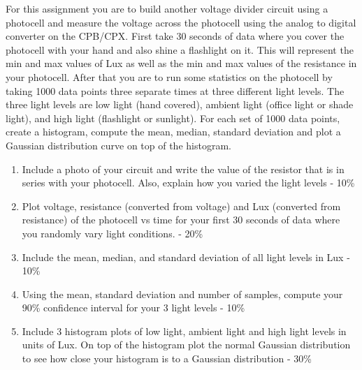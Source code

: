 For this assignment you are to build another voltage divider circuit using a photocell and measure the voltage across the photocell using the analog to digital converter on the CPB/CPX. First take 30 seconds of data where you cover the photocell with your hand and also shine a flashlight on it. This will represent the min and max values of Lux as well as the min and max values of the resistance in your photocell. After that you are to run some statistics on the photocell by taking 1000 data points three separate times at three different light levels. The three light levels are low light (hand covered), ambient light (office light or shade light), and high light (flashlight or sunlight). For each set of 1000 data points, create a histogram, compute the mean, median, standard deviation and plot a Gaussian distribution curve on top of the histogram. 


        
\begin{enumerate}[itemsep=-5pt]
\item Include a photo of your circuit and write the value of the resistor that is in series with your photocell. Also, explain how you varied the light levels - 10\%
\item Plot voltage, resistance (converted from voltage) and Lux (converted from resistance) of the photocell vs time for your first 30 seconds of data where you randomly vary light conditions. - 20\%
\item Include the mean, median, and standard deviation of all light levels in Lux - 10\%
\item Using the mean, standard deviation and number of samples, compute your 90\% confidence interval for your 3 light levels - 10\%
\item Include 3 histogram plots of low light, ambient light and high
light levels in units of Lux. On top of the histogram plot the normal Gaussian distribution to see how close your histogram is to a Gaussian distribution - 30\%
\end{enumerate}
